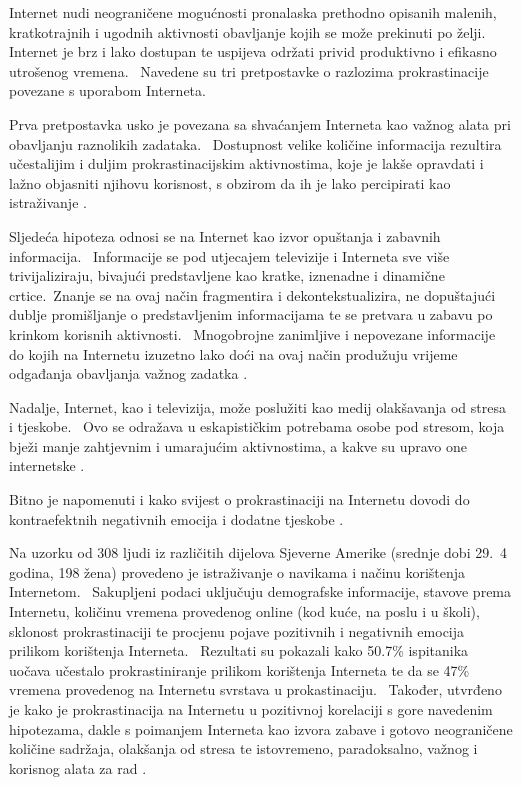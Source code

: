 \documentclass[11pt,twocolumn,english]{article}
\begin{document}
Internet nudi neograničene mogućnosti pronalaska prethodno opisanih malenih, kratkotrajnih i ugodnih 
aktivnosti obavljanje kojih se može prekinuti po želji.~ Internet je brz i lako dostupan te uspijeva održati 
privid produktivno i efikasno utrošenog vremena.~ Navedene su tri pretpostavke o razlozima prokrastinacije
povezane s uporabom Interneta. 

Prva pretpostavka usko je povezana sa shvaćanjem Interneta kao važnog alata pri obavljanju raznolikih 
zadataka.~ Dostupnost velike količine informacija rezultira učestalijim i duljim prokrastinacijskim 
aktivnostima, koje je lakše opravdati i lažno objasniti njihovu korisnost, s obzirom da ih je 
lako percipirati kao istraživanje \cite{Lavoie01cyberslacking}.

Sljedeća hipoteza odnosi se na Internet kao izvor opuštanja i zabavnih informacija.~ Informacije se pod utjecajem 
televizije i Interneta sve više trivijaliziraju, bivajući predstavljene kao kratke, iznenadne i 
dinamične crtice.~Znanje se na ovaj način fragmentira i dekontekstualizira, ne dopuštajući 
dublje promišljanje o predstavljenim informacijama te se pretvara u zabavu po krinkom korisnih aktivnosti.~
Mnogobrojne zanimljive i nepovezane informacije do kojih na Internetu izuzetno lako doći na ovaj način 
produžuju vrijeme odgađanja obavljanja važnog zadatka \cite{Postman85amusing}.

Nadalje, Internet, kao i televizija, može poslužiti kao medij olakšavanja od stresa i tjeskobe.~ 
Ovo se odražava u eskapističkim potrebama osobe pod stresom, koja bježi manje zahtjevnim i umarajućim 
aktivnostima, a kakve su upravo one internetske \cite{Lavoie01cyberslacking}.

Bitno je napomenuti i kako svijest o prokrastinaciji na Internetu dovodi do kontraefektnih negativnih 
emocija i dodatne tjeskobe \cite{Kraut98internet}.

Na uzorku od 308 ljudi iz različitih dijelova Sjeverne Amerike (srednje dobi 29.~4 godina, 198 žena)
provedeno je istraživanje o navikama i načinu korištenja Internetom.~ Sakupljeni
podaci uključuju demografske informacije, stavove prema Internetu, količinu vremena
provedenog online (kod kuće, na poslu i u školi), sklonost prokrastinaciji te procjenu
pojave pozitivnih i negativnih emocija prilikom korištenja Interneta.~ 
Rezultati su pokazali kako 50.7\% ispitanika uočava učestalo prokrastiniranje prilikom
korištenja Interneta te da se 47\% vremena provedenog na Internetu svrstava u prokastinaciju.~
Također, utvrđeno je kako je prokrastinacija na Internetu u pozitivnoj korelaciji s gore navedenim 
hipotezama, dakle s poimanjem Interneta kao izvora zabave i gotovo neograničene količine sadržaja, olakšanja 
od stresa te istovremeno, paradoksalno, važnog i korisnog alata za rad
\cite{Lavoie01cyberslacking}.
\end{document}

